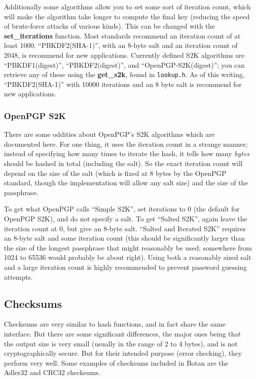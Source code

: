 \documentclass{article}
\newcommand{\filename}[1]{\texttt{#1}}
\newcommand{\function}[1]{\textbf{#1}}
\begin{document}
Additionally some algorithms allow you to set some sort of iteration count,
which will make the algorithm take longer to compute the final key (reducing
the speed of brute-force attacks of various kinds). This can be changed with
the \function{set\_iterations} function. Most standards recommend an iteration
count of at least 1000. ``PBKDF2(SHA-1)'', with an 8-byte salt and an iteration
count of 2048, is recommend for new applications. Currently defined S2K
algorithms are ``PBKDF1(digest)'', ``PBKDF2(digest)'', and
``OpenPGP-S2K(digest)''; you can retrieve any of these using the
\function{get\_s2k}, found in \filename{lookup.h}. As of this writing,
``PBKDF2(SHA-1)'' with 10000 iterations and an 8 byte salt is recommend for new
applications.

\subsubsection{OpenPGP S2K}

There are some oddities about OpenPGP's S2K algorithms which are documented
here. For one thing, it uses the iteration count in a strange manner; instead
of specifying how many times to iterate the hash, it tells how many
\emph{bytes} should be hashed in total (including the salt). So the exact
iteration count will depend on the size of the salt (which is fixed at 8 bytes
by the OpenPGP standard, though the implementation will allow any salt size)
and the size of the passphrase.

To get what OpenPGP calls ``Simple S2K'', set iterations to 0 (the default for
OpenPGP S2K), and do not specify a salt. To get ``Salted S2K'', again leave the
iteration count at 0, but give an 8-byte salt. ``Salted and Iterated S2K''
requires an 8-byte salt and some iteration count (this should be significantly
larger than the size of the longest passphrase that might reasonably be used;
somewhere from 1024 to 65536 would probably be about right). Using both a
reasonably sized salt and a large iteration count is highly recommended to
prevent password guessing attempts.

\subsection{Checksums}

Checksums are very similar to hash functions, and in fact share the same
interface. But there are some significant differences, the major ones being
that the output size is very small (usually in the range of 2 to 4 bytes), and
is not cryptographically secure. But for their intended purpose (error
checking), they perform very well. Some examples of checksums included in Botan
are the Adler32 and CRC32 checksums.
\end{document}
